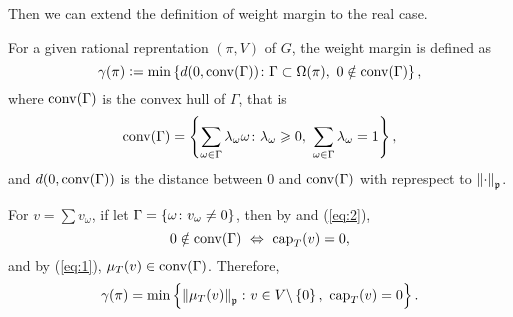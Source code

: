 \documentclass[suri,pdfbookmark]{engsuribt} %
\begin{document}
  Then we can extend the definition of weight margin \cite{key8} to the real case.
  \begin{defn}
    For a given rational reprentation $(\pi,V)$ of $G$, the weight margin is defined as
    \begin{equation*}
      \gamma(\pi) \vcentcolon= \min\left\{d(0,\operatorname{conv}(\Gamma)) \colon \Gamma \subset \Omega(\pi),~0 \notin \operatorname{conv}(\Gamma)\right\},
    \end{equation*}
    where $\operatorname{conv}(\Gamma)$ is the convex hull of $\Gamma$, that is
    \begin{equation*}
      \operatorname{conv}(\Gamma) = \left\{\sum_{\omega \in \Gamma} \lambda_{\omega} \omega \colon \lambda_{\omega} \geqslant 0,~ \sum_{\omega \in \Gamma} \lambda_{\omega} = 1\right\},
    \end{equation*}
    and $d(0,\operatorname{conv}(\Gamma))$ is the distance between $0$ and $\operatorname{conv}(\Gamma)$ with represpect to $\left\lVert\cdot\right\lVert_{\mathfrak{p}}$.
  \end{defn}
  \begin{rem}
    For $v = \sum v_{\omega}$, if let $\Gamma = \left\{\omega \colon v_{\omega} \neq 0\right\}$, then by \cite[Theorem 3.14]{key28} and (\ref{eq:2}),
    \begin{equation*}
      0 \notin \operatorname{conv}(\Gamma) ~\Leftrightarrow~ \operatorname{cap}_T(v) = 0,
    \end{equation*}
    and by (\ref{eq:1}), $\mu_T(v) \in \operatorname{conv}(\Gamma)$. Therefore,
    \begin{equation*}
      \gamma(\pi) = \min\left\{\left\lVert\mu_T(v)\right\lVert_{\mathfrak{p}} \colon v \in V \backslash \left\{0\right\},~\operatorname{cap}_T(v) = 0\right\}.
    \end{equation*}
  \end{rem}
\end{document}
